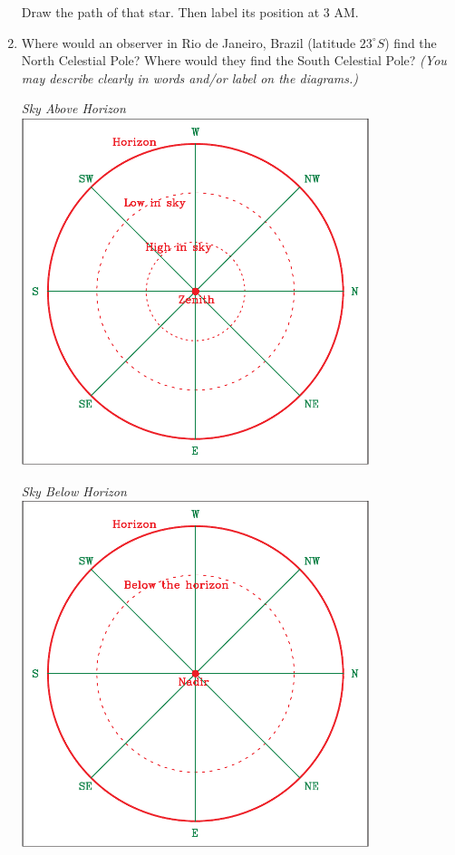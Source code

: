 \documentclass[12pt]{article}
\begin{document}
\begin{enumerate}
		Draw the path of that star. Then label its position at 3 AM.
		
		\newpage
		
		\item Where would an observer in Rio de Janeiro, Brazil (latitude $23^\circ S$) find the North Celestial Pole? Where would they find the South Celestial Pole? {\it (You may describe clearly in words and/or label on the diagrams.)}
		
				\begin{center}
			\begin{minipage}{0.4\textwidth}
				\begin{center}
					\it Sky Above Horizon\\
					\includegraphics[width=0.8\textwidth]{topsky-crop.pdf}
				\end{center}
			\end{minipage}
			\begin{minipage}{0.4\textwidth}
				\begin{center}
					\it Sky Below Horizon\\
					\includegraphics[width=0.8\textwidth]{botsky-crop.pdf}

\end{center}
\end{minipage}
\end{center}
\end{enumerate}
\end{document}
